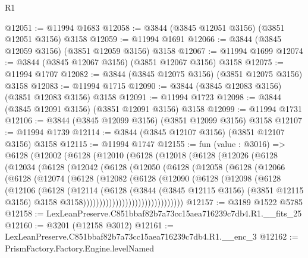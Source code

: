 \begin{lexlean}{R1}
\begin{coremodule}
@12051 := @11994 @1683
@12058 := @3844 (@3845 @12051 @3156) (@3851 @12051 @3156) @3158
@12059 := @11994 @1691
@12066 := @3844 (@3845 @12059 @3156) (@3851 @12059 @3156) @3158
@12067 := @11994 @1699
@12074 := @3844 (@3845 @12067 @3156) (@3851 @12067 @3156) @3158
@12075 := @11994 @1707
@12082 := @3844 (@3845 @12075 @3156) (@3851 @12075 @3156) @3158
@12083 := @11994 @1715
@12090 := @3844 (@3845 @12083 @3156) (@3851 @12083 @3156) @3158
@12091 := @11994 @1723
@12098 := @3844 (@3845 @12091 @3156) (@3851 @12091 @3156) @3158
@12099 := @11994 @1731
@12106 := @3844 (@3845 @12099 @3156) (@3851 @12099 @3156) @3158
@12107 := @11994 @1739
@12114 := @3844 (@3845 @12107 @3156) (@3851 @12107 @3156) @3158
@12115 := @11994 @1747
@12155 := fun (value : @3016) =>
  @6128
    (@12002
      (@6128
        (@12010
          (@6128
            (@12018
              (@6128
                (@12026
                  (@6128
                    (@12034
                      (@6128
                        (@12042
                          (@6128
                            (@12050
                              (@6128
                                (@12058
                                  (@6128
                                    (@12066
                                      (@6128
                                        (@12074
                                          (@6128
                                            (@12082
                                              (@6128
                                                (@12090
                                                  (@6128
                                                    (@12098
                                                      (@6128
                                                        (@12106
                                                          (@6128
                                                            (@12114
                                                              (@6128
                                                                (@3844
                                                                  (@3845 @12115 @3156)
                                                                  (@3851 @12115 @3156)
                                                                  @3158
                                                                  @3158)))))))))))))))))))))))))))))))
@12157 := @3189 @1522 @5785
@12158 := LexLeanPreserve.C851bbaf82b7a73cc15aea716239c7db4.R1.__fits_25
@12160 := @3201 (@12158 @3012)
@12161 := LexLeanPreserve.C851bbaf82b7a73cc15aea716239c7db4.R1.__enc_3
@12162 := PrismFactory.Factory.Engine.levelNamed

\end{coremodule}
\end{lexlean}
